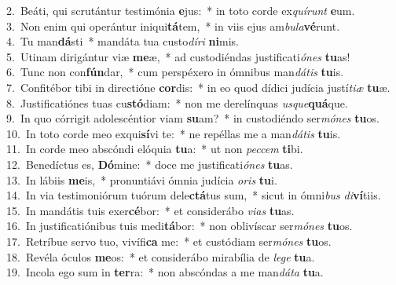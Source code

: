 {2.~}Beáti, qui scrutántur testimónia \textbf{e}jus:~* in toto corde ex\textit{quí}\textit{runt} \textbf{e}um.\\
{3.~}Non enim qui operántur iniqui\textbf{tá}tem,~* in viis ejus am\textit{bu}\textit{la}\textbf{vé}runt.\\
{4.~}Tu man\textbf{dá}sti~* mandáta tua custo\textit{dí}\textit{ri} \textbf{ni}mis.\\
{5.~}Utinam dirigántur viæ \textbf{me}æ,~* ad custodiéndas justificati\textit{ó}\textit{nes} \textbf{tu}as!\\
{6.~}Tunc non con\textbf{fún}dar,~* cum perspéxero in ómnibus man\textit{dá}\textit{tis} \textbf{tu}is.\\
{7.~}Confitébor tibi in directióne \textbf{cor}dis:~* in eo quod dídici judícia justí\textit{ti}\textit{æ} \textbf{tu}æ.\\
{8.~}Justificatiónes tuas cu\textbf{stó}diam:~* non me derelínquas \textit{us}\textit{que}\textbf{quá}que.\\
{9.~}In quo córrigit adolescéntior viam \textbf{su}am?~* in custodiéndo ser\textit{mó}\textit{nes} \textbf{tu}os.\\
{10.~}In toto corde meo exqui\textbf{sí}vi te:~* ne repéllas me a man\textit{dá}\textit{tis} \textbf{tu}is.\\
{11.~}In corde meo abscóndi elóquia \textbf{tu}a:~* ut non \textit{pec}\textit{cem} \textbf{ti}bi.\\
{12.~}Benedíctus es, \textbf{Dó}mine:~* doce me justificati\textit{ó}\textit{nes} \textbf{tu}as.\\
{13.~}In lábiis \textbf{me}is,~* pronuntiávi ómnia judícia \textit{o}\textit{ris} \textbf{tu}i.\\
{14.~}In via testimoniórum tuórum dele\textbf{ctá}tus sum,~* sicut in ómni\textit{bus} \textit{di}\textbf{ví}tiis.\\
{15.~}In mandátis tuis exer\textbf{cé}bor:~* et considerábo \textit{vi}\textit{as} \textbf{tu}as.\\
{16.~}In justificatiónibus tuis medi\textbf{tá}bor:~* non oblivíscar ser\textit{mó}\textit{nes} \textbf{tu}os.\\
{17.~}Retríbue servo tuo, vivífi\textbf{ca} me:~* et custódiam ser\textit{mó}\textit{nes} \textbf{tu}os.\\
{18.~}Revéla óculos \textbf{me}os:~* et considerábo mirabília de \textit{le}\textit{ge} \textbf{tu}a.\\
{19.~}Incola ego sum in \textbf{ter}ra:~* non abscóndas a me man\textit{dá}\textit{ta} \textbf{tu}a.\\
